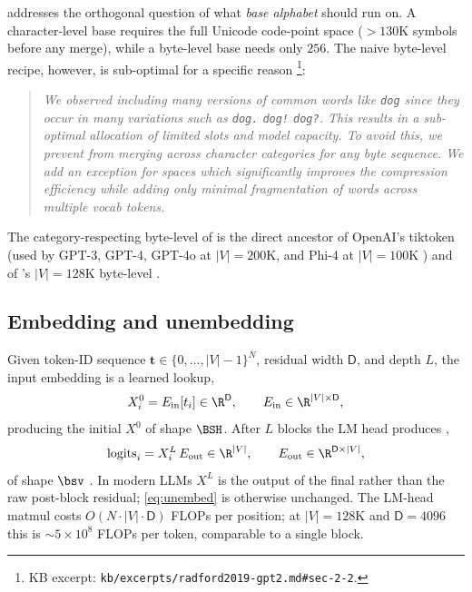 \citet{radford2019-gpt2} addresses the orthogonal question of what
\emph{base alphabet}  should run on. A character-level base requires
the full Unicode code-point space ($> 130\text{K}$ symbols before any
merge), while a byte-level base needs only $256$. The naive
byte-level recipe, however, is sub-optimal for a specific reason
\citep[\S 2.2]{radford2019-gpt2}\footnote{KB excerpt:
\nolinkurl{kb/excerpts/radford2019-gpt2.md#sec-2-2}.}:

\begin{quote}
\itshape We observed  including many versions of common words like
\texttt{dog} since they occur in many variations such as \texttt{dog.}
\texttt{dog!} \texttt{dog?}. This results in a sub-optimal allocation of
limited  slots and model capacity. To avoid this, we prevent
 from merging across character categories for any byte sequence. We
add an exception for spaces which significantly improves the compression
efficiency while adding only minimal fragmentation of words across
multiple vocab tokens.
\end{quote}

The category-respecting byte-level  of \citet{radford2019-gpt2} is
the direct ancestor of OpenAI's tiktoken (used by GPT-3, GPT-4, GPT-4o
at $|V|=200\text{K}$, and Phi-4 at $|V|=100\text{K}$
\citep[\S 2.1]{phi4}) and of 's $|V|=128\text{K}$ byte-level
 \citep[\S 2.1]{deepseek-v3}.

\subsection{Embedding and unembedding}
\label{sec:tok-embed-unembed}

Given token-ID sequence $\mathbf{t} \in \{0, \dots, |V|-1\}^N$, residual
width $\mathsf{D}$, and depth $L$, the input embedding is a learned
lookup,
\begin{equation}
X^0_i = E_{\text{in}}[t_i] \in \R^{\mathsf{D}}, \qquad
E_{\text{in}} \in \R^{|V| \times \mathsf{D}},
\label{eq:embed}
\end{equation}
producing the initial  $X^0$ of shape $\BSH$. After $L$
blocks the LM head produces ,
\begin{equation}
\mathrm{logits}_i = X^L_i \, E_{\text{out}} \in \R^{|V|}, \qquad
E_{\text{out}} \in \R^{\mathsf{D} \times |V|},
\label{eq:unembed}
\end{equation}
of shape $\bsv$ \citep[\S 3.4]{vaswani2017}. In modern 
LLMs $X^L$ is the output of the final  rather than the raw
post-block residual; \cref{eq:unembed} is otherwise unchanged. The
LM-head matmul costs $O(N \cdot |V| \cdot \mathsf{D})$ FLOPs per
position; at $|V| = 128\text{K}$ and $\mathsf{D} = 4096$ this is
$\sim\!5\times 10^{8}$ FLOPs per token, comparable to a single
 block.

